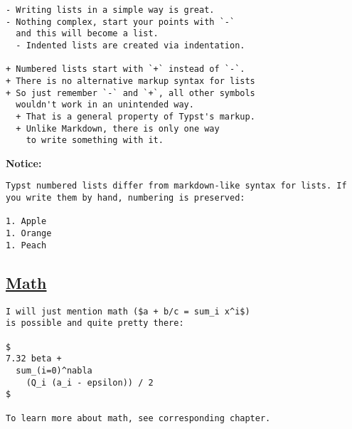 \begin{verbatim}
- Writing lists in a simple way is great.
- Nothing complex, start your points with `-`
  and this will become a list.
  - Indented lists are created via indentation.

+ Numbered lists start with `+` instead of `-`.
+ There is no alternative markup syntax for lists
+ So just remember `-` and `+`, all other symbols
  wouldn't work in an unintended way.
  + That is a general property of Typst's markup.
  + Unlike Markdown, there is only one way
    to write something with it.
\end{verbatim}

\pandocbounded{}

\textbf{Notice:}

\begin{verbatim}
Typst numbered lists differ from markdown-like syntax for lists. If you write them by hand, numbering is preserved:

1. Apple
1. Orange
1. Peach
\end{verbatim}

\pandocbounded{}

\subsection{\texorpdfstring{\hyperref[math]{Math}}{Math}}\label{math}

\begin{verbatim}
I will just mention math ($a + b/c = sum_i x^i$)
is possible and quite pretty there:

$
7.32 beta +
  sum_(i=0)^nabla
    (Q_i (a_i - epsilon)) / 2
$

To learn more about math, see corresponding chapter.
\end{verbatim}

\pandocbounded{}
